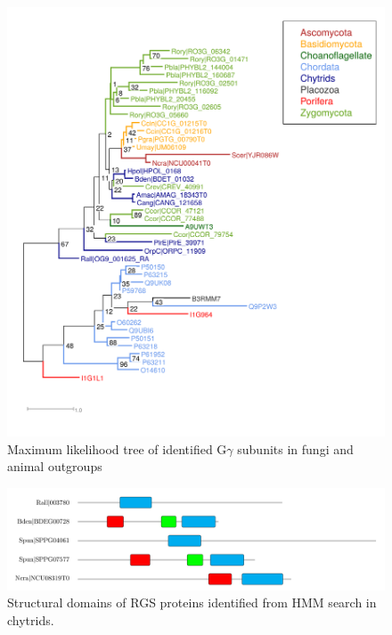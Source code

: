 \begin{figure}[hb]
  \centering
  \includegraphics{./Chapter_RhodAux/img/Ggamma_tree.png}
  \caption[Gbeta tree]{Maximum likelihood tree of identified G$\gamma$ subunits in fungi and animal outgroups}
  \label{fig:ChRhodA_GgammaTree}
\end{figure}

\begin{figure}[hb]
  \centering
  \includegraphics{./Chapter_RhodAux/img/ChyNcra_RGS.png}
  \caption[RGS proteins]{Structural domains of RGS proteins identified from HMM search in chytrids.}
  \label{fig:ChRhodA_RGS}
\end{figure}
